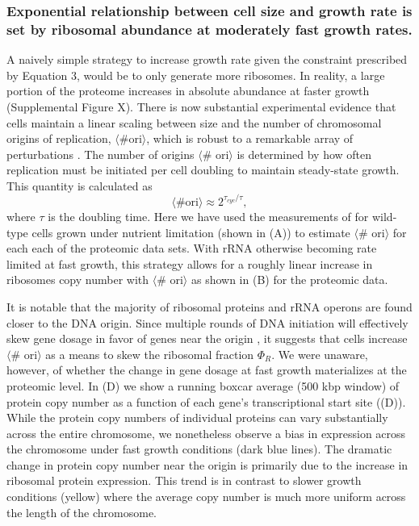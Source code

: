 \subsubsection{Exponential relationship between cell size and growth rate is
set by ribosomal abundance at moderately fast growth rates.}
A naively simple strategy to increase growth rate given the constraint
prescribed by Equation 3, would be to only generate more ribosomes. In
reality, a large portion of the proteome increases in absolute abundance at faster growth
(Supplemental Figure X).  There is now substantial experimental evidence that
cells maintain a linear scaling between size and the number of chromosomal
origins of replication, $\langle\text{\# ori}\rangle$, which is robust to a
remarkable array of perturbations \citep{si2017}. The number of origins
$\langle$\# ori$\rangle$ is determined by how often replication must be
initiated per cell doubling to maintain steady-state growth. This quantity is
calculated as
\begin{equation}
    \langle \text{\# ori} \rangle \approx 2^{\tau_{cyc} / \tau},
\end{equation}
where $\tau$ is the doubling time. Here we have used the measurements of
\cite{si2017} for wild-type cells grown under nutrient limitation (shown in
(A)) to estimate $\langle$\# ori$\rangle$ for each
each of the  proteomic data sets.
With rRNA otherwise becoming rate limited at fast growth, this strategy allows for
a roughly linear increase in ribosomes copy number with $\langle$\# ori$\rangle$
as shown in (B) for the proteomic data.

It is notable that the majority of ribosomal proteins and rRNA operons are found
closer to the DNA origin. Since multiple rounds of DNA initiation will effectively
skew gene dosage in favor of genes near the origin \citep{scholz2019}, it suggests
that cells increase  $\langle$\# ori$\rangle$ as a means to skew the ribosomal fraction $\Phi_R$.
We were unaware, however, of whether the change in gene dosage at fast growth
materializes at the proteomic level. In (D) we show
a running boxcar average (500 kbp window) of protein copy number as a function
of each gene's transcriptional start site ((D)).
While the protein copy numbers of individual proteins can vary substantially
across the entire chromosome, we nonetheless observe a bias in expression across
the chromosome under fast growth conditions (dark blue lines). The dramatic
change in protein copy number near the origin is primarily due to the increase
in ribosomal protein expression. This trend is in contrast to slower growth
conditions (yellow) where the average copy number is much more uniform across
the length of the chromosome.

